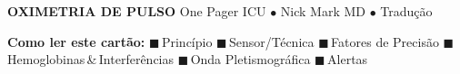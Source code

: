 \documentclass[landscape,a3paper]{article}
\begin{document}
\noindent\colorbox{titleBar}{\parbox{\dimexpr\textwidth-4pt}{%
  \centering\vspace{2pt}%
  {\color{white}\bfseries\Large OXIMETRIA DE PULSO}%
  \hfill{\color{white!70}\scriptsize One Pager ICU $\bullet$ Nick Mark MD $\bullet$ Tradução}%
  \vspace{2pt}%
}}

\vspace{2pt}

\noindent\colorbox{sensorLight}{\parbox{\dimexpr\textwidth-4pt}{%
  \centering\scriptsize%
  \textbf{Como ler este cartão:}
  \textcolor{physRed}{$\blacksquare$}\,Princípio
  \quad\textcolor{sensorBlue}{$\blacksquare$}\,Sensor/Técnica
  \quad\textcolor{precGreen}{$\blacksquare$}\,Fatores de Precisão
  \quad\textcolor{hemPurple}{$\blacksquare$}\,Hemoglobinas\,\&\,Interferências
  \quad\textcolor{waveBlue}{$\blacksquare$}\,Onda Pletismográfica
  \quad\textcolor{warnOrange}{$\blacksquare$}\,Alertas
}}

\vspace{3pt}

\setlength{\columnsep}{6pt}
\setlength{\columnseprule}{0.3pt}
\renewcommand{\columnseprulecolor}{\color{gray!40}}
\end{document}
